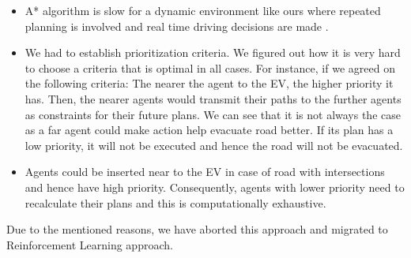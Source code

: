 \begin{itemize}
    \item A* algorithm is slow  for a dynamic environment like ours where repeated planning is involved and real time driving decisions are made . 
    \item We had to establish prioritization criteria. We figured out how it is very hard to choose a criteria that is optimal in all cases. For instance, if we agreed on the following criteria:  The nearer the agent to the EV, the higher priority it has. Then, the nearer agents would transmit their paths to the further agents as constraints for their future plans. We can see that it is not always the case as a far agent could make action help evacuate road better. If its plan has a low priority, it will not be executed and hence the road will not be evacuated. 
\item  Agents could be inserted near to the EV in case of road with intersections and hence have high priority. Consequently, agents with lower priority need to recalculate their plans and this is computationally exhaustive. 

\end{itemize}
Due to the mentioned reasons, we have aborted this approach and migrated to Reinforcement Learning approach.





